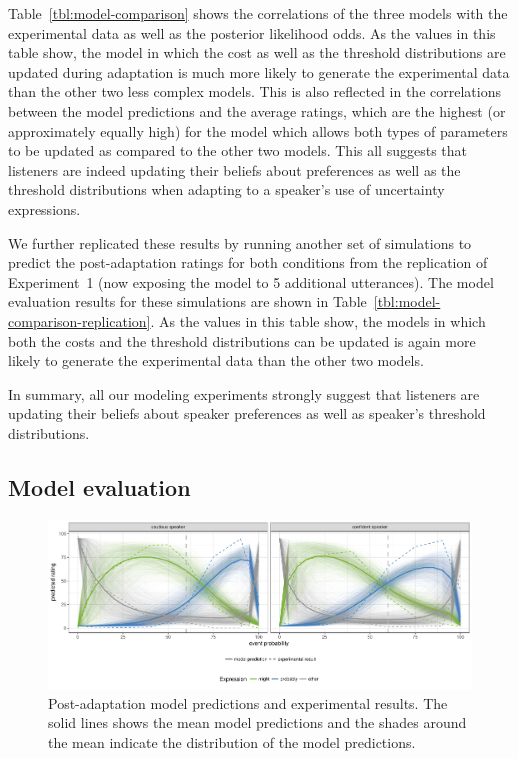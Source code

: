 \documentclass[lucida,biblatex]{sp} %
\begin{document}
Table~\ref{tbl:model-comparison} shows the correlations of the three models with the experimental data as well as the
 posterior likelihood odds. As the values in this table show, the model in which the cost as well as the threshold 
 distributions are updated during adaptation is much more likely to generate the experimental data than the other 
 two less complex models. This is also reflected in the correlations between the model predictions and the average 
 ratings, which are the highest (or approximately equally high) for the model which allows both types of parameters 
 to be updated as compared to the other two models. This all suggests that listeners are indeed updating their beliefs 
 about preferences as well as the threshold distributions when adapting to a speaker's use of uncertainty expressions.

We further replicated these results by running another set of simulations to predict the post-adaptation ratings for both 
conditions from the replication of Experiment~1 (now exposing the model to 5 additional utterances). The model 
evaluation results for these simulations are shown in Table~\ref{tbl:model-comparison-replication}. As the values
in this table show, the models in which both the costs and the threshold distributions can be updated is again more
likely to generate the experimental data than the other two models.

In summary, all our modeling experiments strongly suggest that listeners are updating their beliefs about speaker
preferences as well as speaker's threshold distributions.

\subsection{Model evaluation}

\begin{figure}
  \includegraphics[width=\textwidth]{plots/adaptation-posterior-predictions.pdf}
  \caption{Post-adaptation model predictions and experimental results. 
  The solid lines shows the mean model predictions and the shades around the mean indicate the distribution of the model predictions. \label{fig:post-exposure-model}}
\end{figure}
\end{document}
